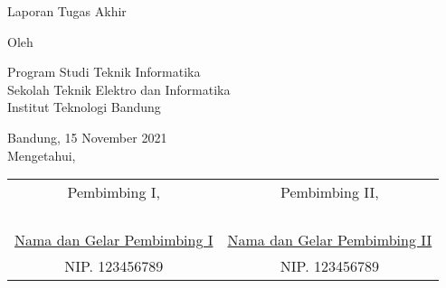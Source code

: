 \clearpage
\pagestyle{empty}

\begin{center}
    \smallskip

    \Large \bfseries \MakeUppercase{\thetitle}
    \vfill

    \Large Laporan Tugas Akhir
    \vfill

    \large Oleh

    \Large \theauthor

    \large Program Studi Teknik Informatika \\

    \normalsize \normalfont
    Sekolah Teknik Elektro dan Informatika \\
    Institut Teknologi Bandung

    \vfill
    \normalsize \normalfont
    Bandung, 15 November 2021 \\
    Mengetahui,

    \vspace{0.5cm}
    \setlength{\tabcolsep}{12pt}
    \begin{tabular}{c@{\hskip 0.5in}c}
        Pembimbing I,                           & Pembimbing II,                           \\
                                                &                                          \\
                                                &                                          \\
                                                &                                          \\
                                                &                                          \\
        \underline{Nama dan Gelar Pembimbing I} & \underline{Nama dan Gelar Pembimbing II} \\
        NIP. 123456789                          & NIP. 123456789                           \\
    \end{tabular}

\end{center}
\clearpage
